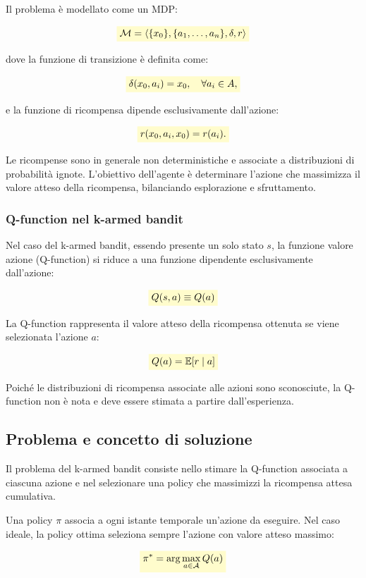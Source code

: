 \documentclass[a4paper,12pt]{report}
\newcommand{\highlight}[1]{%
\colorbox{yellow!20}{$\displaystyle #1$}%
}
\begin{document}
Il problema è modellato come un MDP:

\[
\highlight{
\mathcal{M} = \langle \{x_0\}, \{a_1, \dots, a_n\}, \delta, r \rangle}
\]

dove la funzione di transizione è definita come:

\[
\highlight{
\delta(x_0, a_i) = x_0, \quad \forall a_i \in A,}
\]

e la funzione di ricompensa dipende esclusivamente dall'azione:

\[
\highlight{
r(x_0, a_i, x_0) = r(a_i).}
\]

Le ricompense sono in generale non deterministiche e associate a
distribuzioni di probabilità ignote. L'obiettivo dell'agente è
determinare l'azione che massimizza il valore atteso della ricompensa,
bilanciando esplorazione e sfruttamento.

\subsubsection{Q-function nel k-armed bandit}

Nel caso del k-armed bandit, essendo presente un solo stato $s$,
la funzione valore azione (Q-function) si riduce a una funzione
dipendente esclusivamente dall’azione:

\[
\highlight{
Q(s,a) \equiv Q(a)}
\]

La Q-function rappresenta il valore atteso della ricompensa ottenuta
se viene selezionata l’azione $a$:

\[
\highlight{
Q(a) = \mathbb{E}[r \mid a]}
\]

Poiché le distribuzioni di ricompensa associate alle azioni sono
sconosciute, la Q-function non è nota e deve essere stimata a partire
dall’esperienza.

\subsection{Problema e concetto di soluzione}

Il problema del k-armed bandit consiste nello stimare la Q-function
associata a ciascuna azione e nel selezionare una policy che massimizzi
la ricompensa attesa cumulativa.

Una policy $\pi$ associa a ogni istante temporale un’azione da eseguire.
Nel caso ideale, la policy ottima seleziona sempre l’azione con valore
atteso massimo:

\[
\highlight{
\pi^* = \arg\max_{a \in \mathcal{A}} Q(a)}
\]
\end{document}
